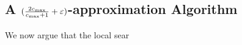 
\subsection{A $(\frac{2c_{\max}}{c_{\max}+1} + \varepsilon)$-approximation Algorithm}


We now argue that the local sear






